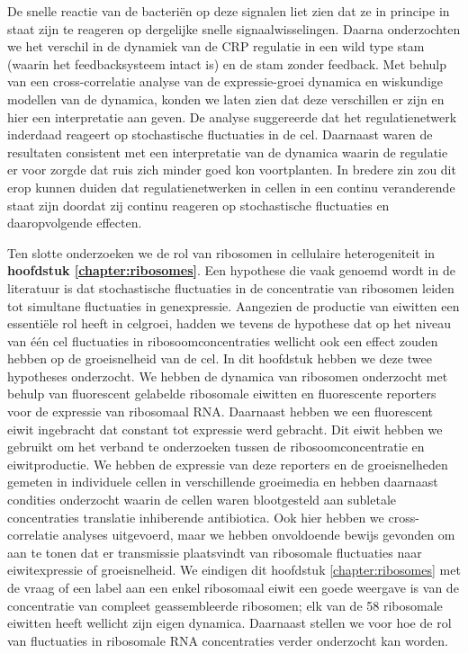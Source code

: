 %
De snelle reactie van de bacteriën op deze signalen liet zien dat ze in principe in staat zijn 
te reageren op dergelijke snelle signaalwisselingen.
%
%
Daarna onderzochten we het verschil in de dynamiek van de CRP regulatie in een wild type \ecoli stam (waarin het feedbacksysteem intact is) en de \ecoli stam zonder feedback.
%
Met behulp van een cross-correlatie analyse van de expressie-groei dynamica en wiskundige modellen van de dynamica, konden we laten zien dat deze verschillen er zijn en hier een interpretatie aan geven.
%
De analyse suggereerde dat het regulatienetwerk inderdaad reageert op stochastische fluctuaties in de cel.
Daarnaast waren de resultaten consistent met een interpretatie van de dynamica waarin de regulatie er voor zorgde dat ruis zich minder goed kon voortplanten.
%
In bredere zin zou dit erop kunnen duiden dat regulatienetwerken in cellen in een continu veranderende staat zijn doordat zij continu reageren op stochastische fluctuaties en daaropvolgende effecten.


Ten slotte onderzoeken we de rol van ribosomen in cellulaire heterogeniteit in \textbf{hoofdstuk \ref{chapter:ribosomes}}.
%
Een hypothese die vaak genoemd wordt in de 
literatuur is dat stochastische fluctuaties in de concentratie van ribosomen leiden tot 
simultane fluctuaties in genexpressie. 
%
Aangezien de productie van eiwitten een essentiële 
rol heeft in celgroei,
hadden we tevens de hypothese dat op het niveau van één cel fluctuaties in ribosoomconcentraties wellicht ook een effect zouden hebben op de groeisnelheid van de cel.
%
In dit hoofdstuk hebben we deze twee hypotheses onderzocht.
% 
We hebben de dynamica van ribosomen onderzocht met behulp van fluorescent gelabelde ribosomale eiwitten en fluorescente reporters voor de expressie van ribosomaal RNA.
%
Daarnaast hebben we een fluorescent eiwit ingebracht dat constant tot expressie werd gebracht.
%
Dit eiwit hebben we gebruikt om het verband te onderzoeken tussen de ribosoomconcentratie en eiwitproductie.
%
We hebben de expressie van deze reporters en de groeisnelheden gemeten in individuele cellen in verschillende groeimedia en hebben daarnaast condities onderzocht waarin de cellen waren blootgesteld aan subletale concentraties translatie inhiberende antibiotica.
%
Ook hier hebben we cross-correlatie analyses uitgevoerd, 
maar we hebben onvoldoende bewijs gevonden om aan te tonen
dat er transmissie plaatsvindt van ribosomale fluctuaties 
naar eiwitexpressie of groeisnelheid.
%
We eindigen dit hoofdstuk \ref{chapter:ribosomes} met de vraag of een label aan een enkel ribosomaal eiwit een goede weergave is van de concentratie van compleet geassembleerde ribosomen; elk van de 58 ribosomale eiwitten heeft wellicht zijn eigen dynamica.
%
Daarnaast stellen we voor hoe de rol van fluctuaties in ribosomale RNA concentraties verder onderzocht kan worden.





